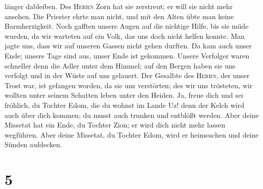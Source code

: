 länger dableiben.  Des \textsc{Herrn} Zorn hat sie
zerstreut; er will sie nicht mehr ansehen. Die Priester ehrte man nicht,
und mit den Alten übte man keine Barmherzigkeit.  Noch
gafften unsere Augen auf die nichtige Hilfe, bis sie müde wurden, da wir
warteten auf ein Volk, das uns doch nicht helfen konnte. 
Man jagte uns, dass wir auf unseren Gassen nicht gehen durften. Da kam
auch unser Ende; unsere Tage sind aus, unser Ende ist gekommen.
 Unsere Verfolger waren schneller denn die Adler unter
dem Himmel; auf den Bergen haben sie uns verfolgt und in der Wüste auf
uns gelauert.  Der Gesalbte des \textsc{Herrn}, der unser
Trost war, ist gefangen worden, da sie uns verstörten; des wir uns
trösteten, wir wollten unter seinem Schatten leben unter den Heiden.
 Ja, freue dich und sei fröhlich, du Tochter Edom, die du
wohnst im Lande Uz! denn der Kelch wird auch über dich kommen; du musst
auch trunken und entblößt werden.  Aber deine Missetat
hat ein Ende, du Tochter Zion; er wird dich nicht mehr lassen wegführen.
Aber deine Missetat, du Tochter Edom, wird er heimsuchen und deine
Sünden aufdecken.

\hypertarget{section-4}{%
\section{5}\label{section-4}}

